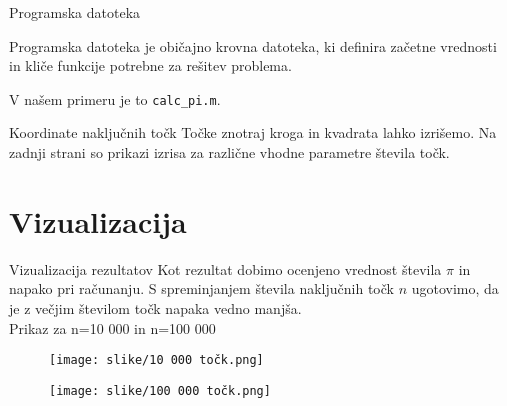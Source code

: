\documentclass{beamer}
\begin{document}
\begin{frame}{Programska datoteka}
    \item Programska datoteka je običajno krovna datoteka, ki definira začetne vrednosti
    in kliče funkcije potrebne za rešitev problema.
    \pause
    \item V našem primeru je to \texttt{calc\_pi.m}.
\end{frame}

\begin{frame}{Koordinate naključnih točk}
Točke znotraj kroga in kvadrata lahko izrišemo.
Na zadnji strani so prikazi izrisa za različne vhodne parametre števila točk.
\begin{figure}
\end{figure}
\end{frame}

\section{Vizualizacija}
\begin{frame}{Vizualizacija rezultatov}
    Kot rezultat dobimo ocenjeno vrednost števila $\pi$ in napako pri računanju.  S spreminjanjem števila naključnih točk $n$ ugotovimo, da je z večjim številom točk napaka vedno manjša. \\
    \pause
    Prikaz za n=10 000 in n=100 000
\begin{figure}
  \begin{minipage}{0.5\textwidth}
    \centering
    \texttt{[image: slike/10 000 točk.png]}
  \end{minipage}\hfill
  \pause
  \begin{minipage}{0.45\textwidth}
    \centering
    \texttt{[image: slike/100 000 točk.png]}
  \end{minipage}
\end{figure}

\end{frame}
\end{document}
